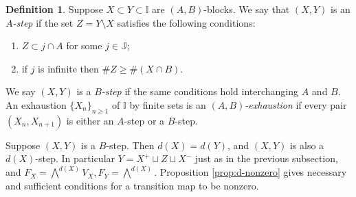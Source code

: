 \documentclass[11pt,fleqn]{amsart}
\newcommand\II{\mathbb I}
\newcommand\JJ{\mathbb J}
\theoremstyle{definition}
\newtheorem{defn}[thm]{Definition}
\theoremstyle{remark}
\theoremstyle{remark}
\begin{document}
\begin{defn}
Suppose $X \subset Y \subset \II$ are $(A,B)$-blocks. We say 
that $(X,Y)$ is an \emph{$A$-step} if the set $Z = Y \setminus X$ satisfies the following 
conditions:
\begin{enumerate}
  \item $Z \subset j \cap A$ for some $j \in \JJ$;
  \item if $j$ is infinite then $\#Z \geq \# (X \cap B)$.
\end{enumerate}
We say $(X,Y)$ is a \emph{$B$-step} if the same conditions hold interchanging 
$A$ and $B$. An exhaustion $\{X_n\}_{n \geq 1}$ of $\II$ by finite sets is an 
\emph{$(A,B)$-exhaustion} if every pair $(X_n, X_{n+1})$ is either an $A$-step
or a $B$-step.
\end{defn}
Suppose $(X,Y)$ is a $B$-step. Then $d(X) = d(Y)$, and $(X,Y)$ is also a 
$d(X)$-step. In particular $Y = X^+ \sqcup Z \sqcup X^-$ just as in the 
previous subsection, and $F_X = \bigwedge^{d(X)} V_X, F_Y = \bigwedge^{d(X)}$. 
Proposition \ref{prop:d-nonzero} gives necessary and sufficient conditions for
a transition map to be nonzero.
\end{document}
